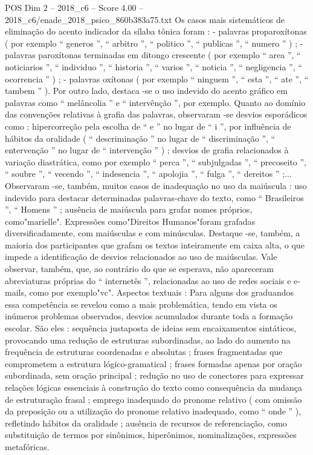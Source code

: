 \begin{textsample}{POS Dim 2 – 2018\_c6 – Score 4.00 – 2018\_c6/enade\_2018\_psico\_860b383a75.txt}
Os casos mais sistemáticos de eliminação do acento indicador da sílaba tônica foram : - palavras proparoxítonas ( por exemplo “ generos ”, “ arbitro ”, “ politico ”, “ publicas ”, “ numero ” ) ; - palavras paroxítonas terminadas em ditongo crescente ( por exemplo “ area ”, “ noticiarios ”, “ individuo ”, “ historia ”, “ varios ”, “ noticia ”, “ negligencia ”, “ ocorrencia ” ) ; - palavras oxítonas ( por exemplo “ ninguem ”, “ esta ”, “ ate ”, “ tambem ” ).
Por outro lado, destaca -se o uso indevido do acento gráfico em palavras como “ melâncolia ” e “ intervênção ”, por exemplo.
Quanto ao domínio das convenções relativas à grafia das palavras, observaram -se desvios esporádicos como : hipercorreção pela escolha de “ e ” no lugar de “ i ”, por influência de hábitos da oralidade ( “ descriminação ” no lugar de “ discriminação ”, “ entervenção ” no lugar de “ intervenção ” ) ; desvios de grafia relacionados à variação diastrática, como por exemplo “ perca ”, “ subjulgadas ”, “ precoseito ”, “ soubre ”, “ vecendo ”, “ indesencia ”, “ apolojia ”, “ fulga ”, “ dereitos ” ;...
Observaram -se, também, muitos casos de inadequação no uso da maiúscula : uso indevido para destacar determinadas palavras-chave do texto, como “ Brasileiros ”, “ Homens ” ; ausência de maiúscula para grafar nomes próprios, como"marielle".
Expressões como"Direitos Humanos"foram grafadas diversificadamente, com maiúsculas e com minúsculas.
Destaque -se, também, a maioria dos participantes que grafam os textos inteiramente em caixa alta, o que impede a identificação de desvios relacionados ao uso de maiúsculas.
Vale observar, também, que, ao contrário do que se esperava, não apareceram abreviaturas próprias do “ internetês ”, relacionadas ao uso de redes sociais e e-mails, como por exemplo"vc".
Aspectos textuais : Para alguns dos graduandos essa competência se revelou como a mais problemática, tendo em vista os inúmeros problemas observados, desvios acumulados durante toda a formação escolar.
São eles : sequência justaposta de ideias sem encaixamentos sintáticos, provocando uma redução de estruturas subordinadas, ao lado do aumento na frequência de estruturas coordenadas e absolutas ; frases fragmentadas que comprometem a estrutura lógico-gramatical ; frases formadas apenas por oração subordinada, sem oração principal ; redução no uso de conectores para expressar relações lógicas essenciais à construção do texto como consequência da mudança de estruturação frasal ; emprego inadequado do pronome relativo ( com omissão da preposição ou a utilização do pronome relativo inadequado, como “ onde ” ), refletindo hábitos da oralidade ; ausência de recursos de referenciação, como substituição de termos por sinônimos, hiperônimos, nominalizações, expressões metafóricas.

\end{textsample}
